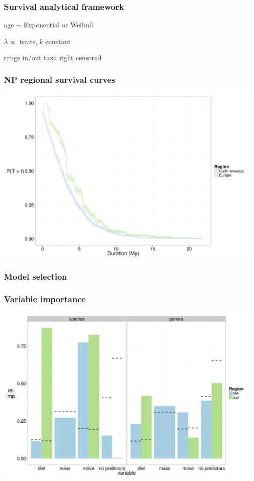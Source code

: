 \documentclass{beamer}
\begin{document}
\begin{frame}
  \frametitle{Survival analytical framework}

  age \(\sim\) Exponential or Weibull

  \(\lambda \propto\) traits, \(k\) constant

  range in/out taxa right censored

\end{frame}

\begin{frame}
  \frametitle{NP regional survival curves}

  \includegraphics[height=0.8\textheight,width=\textwidth,keepaspectratio=true]{figure/kms_region}

\end{frame}

\begin{frame}
  \frametitle{Model selection}

\end{frame}

\begin{frame}
  \frametitle{Variable importance}
  \includegraphics[height=0.8\textheight,width=\textwidth,keepaspectratio=true]{figure/rel_imp_com}

\end{frame}
\end{document}
